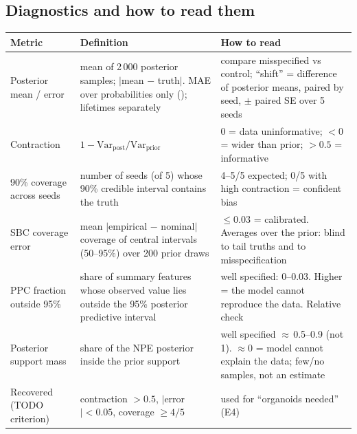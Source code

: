 \documentclass[10pt,a4paper]{article}
\newcommand{\code}[1]{\texttt{\detokenize{#1}}}
\begin{document}
\subsection{Diagnostics and how to read them}
\begin{center}\footnotesize
\begin{tabularx}{\linewidth}{@{}P{3.0cm}YY@{}}\toprule
\textbf{Metric} & \textbf{Definition} & \textbf{How to read} \\\midrule
Posterior mean / error & mean of 2\,000 posterior samples; $|$mean $-$ truth$|$. MAE over probabilities only (\code{mae_probabilities}); lifetimes separately & compare misspecified vs control; ``shift'' = difference of posterior means, paired by seed, $\pm$ paired SE over 5 seeds \\
Contraction & $1-\mathrm{Var}_\text{post}/\mathrm{Var}_\text{prior}$ & 0 = data uninformative; $<0$ = wider than prior; $>0.5$ = informative \\
90\% coverage across seeds & number of seeds (of 5) whose 90\% credible interval contains the truth & 4--5/5 expected; 0/5 with high contraction = confident bias \\
SBC coverage error & mean $|$empirical $-$ nominal$|$ coverage of central intervals (50--95\%) over 200 prior draws & $\le 0.03$ = calibrated. Averages over the prior: blind to tail truths and to misspecification \\
PPC fraction outside 95\% & share of summary features whose observed value lies outside the 95\% posterior predictive interval & well specified: 0--0.03. Higher = the model cannot reproduce the data. Relative check \\
Posterior support mass & share of the NPE posterior inside the prior support & well specified $\approx$\,0.5--0.9 (not 1). $\approx 0$ = model cannot explain the data; few/no samples, not an estimate \\
Recovered (TODO criterion) & contraction $>0.5$, $|$error$|<0.05$, coverage $\ge 4/5$ & used for ``organoids needed'' (E4) \\\bottomrule
\end{tabularx}
\end{center}
\end{document}
